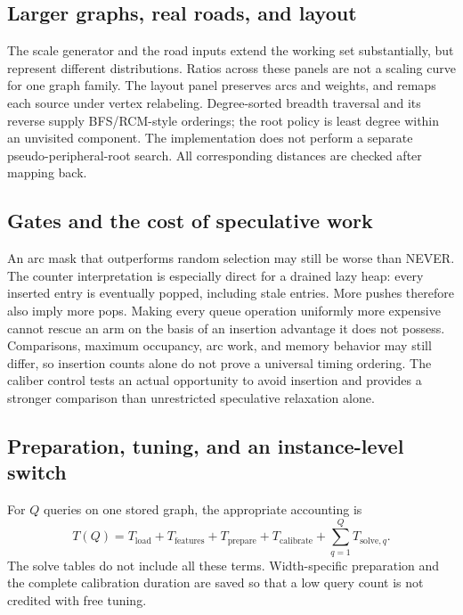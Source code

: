 \documentclass[11pt]{article}
\begin{document}
\subsection{Larger graphs, real roads, and layout}


The scale generator and the road inputs extend the working set substantially,
but represent different distributions. Ratios across these panels are not a
scaling curve for one graph family. The layout panel preserves arcs and weights,
and remaps each source under vertex relabeling. Degree-sorted breadth traversal
and its reverse supply BFS/RCM-style orderings; the root policy is least degree
within an unvisited component. The implementation does not perform a separate
pseudo-peripheral-root search. All corresponding distances are checked after
mapping back. 

\subsection{Gates and the cost of speculative work}


An arc mask that outperforms random selection may still be worse than NEVER.
The counter interpretation is especially direct for a drained lazy heap:
every inserted entry is eventually popped, including stale entries. More pushes
therefore also imply more pops. Making every queue operation uniformly more
expensive cannot rescue an arm on the basis of an insertion advantage it does
not possess. Comparisons, maximum occupancy, arc work, and memory behavior may
still differ, so insertion counts alone do not prove a universal timing ordering.
The caliber control tests an actual opportunity to avoid insertion and provides
a stronger comparison than unrestricted speculative relaxation alone.

\subsection{Preparation, tuning, and an instance-level switch}
For $Q$ queries on one stored graph, the appropriate accounting is
\[
 T(Q)=T_{\mathrm{load}}+T_{\mathrm{features}}+T_{\mathrm{prepare}}
      +T_{\mathrm{calibrate}}+\sum_{q=1}^Q T_{\mathrm{solve},q}.
\]
The solve tables do not include all these terms. Width-specific preparation and
the complete calibration duration are saved so that a low query count is not
credited with free tuning. 
\end{document}
